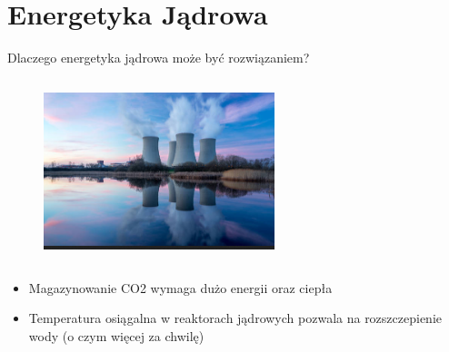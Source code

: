 \section{Energetyka Jądrowa}

\begin{columnframe}{Dlaczego energetyka jądrowa może być rozwiązaniem?}
    \begin{column}{0.5\textwidth}
        \begin{figure}
            \centering
            \includegraphics[width=0.6\textwidth, frame]{images/nuclear_powerplant_shutterstock.png}
        \end{figure}
    \end{column}
    \begin{column}{0.5\textwidth}
        \begin{itemize}
            \item Magazynowanie CO2 wymaga dużo energii oraz ciepła
            \item Temperatura osiągalna w reaktorach jądrowych pozwala na rozszczepienie wody (o czym więcej za chwilę)
        \end{itemize}
    \end{column}
\end{columnframe}


